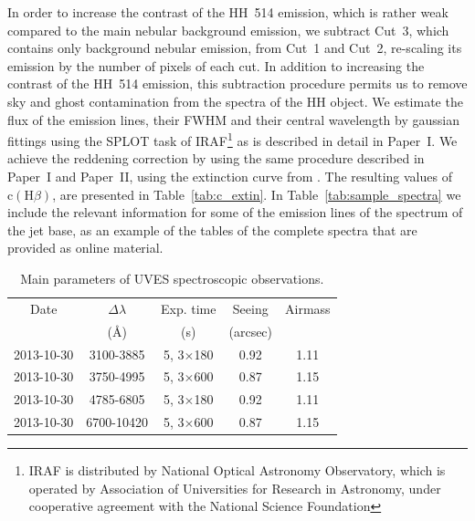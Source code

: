 \documentclass[fleqn,usenatbib]{mnras}
\begin{document}
In order to increase the contrast of the HH~514 emission, which is rather weak compared to the main nebular background emission, we subtract Cut~3, which contains only background nebular emission, from Cut~1 and Cut~2, re-scaling its emission by the number of pixels of each cut. In addition to increasing the contrast of the HH~514 emission, this subtraction procedure permits us to remove sky and ghost contamination from the spectra of the HH object. We estimate the flux of the emission lines, their FWHM and their central wavelength by gaussian fittings using the SPLOT task of IRAF\footnote{IRAF is distributed by National Optical Astronomy Observatory, which is operated by Association of Universities for Research in Astronomy, under cooperative agreement with the National Science Foundation} \citep{Tody93} as is described in detail in Paper~I. We achieve the reddening correction by using the same procedure described in Paper~I and Paper~II, using the extinction curve from \citet{Blagrave07}. The resulting values of $\text{c}(\text{H}\beta)$, are presented in Table~\ref{tab:c_extin}. In Table~\ref{tab:sample_spectra} we include the relevant information for some of the emission lines of the spectrum of the jet base, as an example of the tables of the complete spectra that are provided as online material.

\begin{table}
\caption{Main parameters of UVES spectroscopic observations.}
\label{tab:obs_set}
\begin{tabular}{ccccc}
\hline
Date & $\Delta \lambda$& Exp. time  &Seeing &Airmass\\
 & (\AA) &  (s) & (arcsec)&\\
\hline
2013-10-30 & 3100-3885 & 5, 3$\times$180 &0.92&1.11\\
2013-10-30 & 3750-4995 & 5, 3$\times$600 & 0.87 & 1.15\\
2013-10-30 & 4785-6805 & 5, 3$\times$180 &0.92&1.11\\
2013-10-30 & 6700-10420 & 5, 3$\times$600 & 0.87 & 1.15\\
\hline
\end{tabular}
\end{table}
\end{document}
